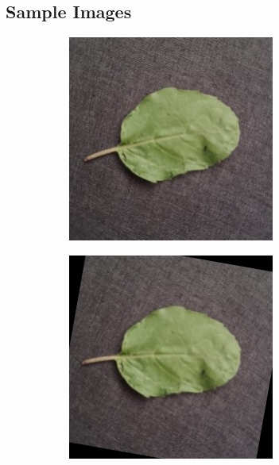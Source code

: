 \documentclass[twocolumn]{article}
\begin{document}
\subsection{Sample Images}
\begin{figure}[H]
    \centering
    \begin{subfigure}[b]{0.30\columnwidth}
        \includegraphics[width=\textwidth]{tulsi1}
    \end{subfigure}
    \hfill
    \begin{subfigure}[b]{0.30\columnwidth}
        \includegraphics[width=\textwidth]{tulsi2}

\end{subfigure}
\end{figure}
\end{document}
